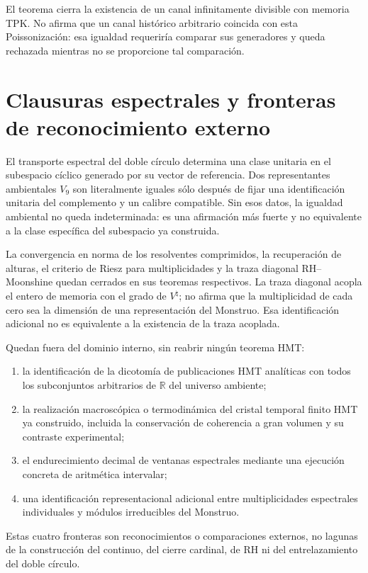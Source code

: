 El teorema cierra la existencia de un canal infinitamente divisible con
memoria TPK\@. No afirma que un canal histórico arbitrario coincida con esta
Poissonización: esa igualdad requeriría comparar sus generadores y queda
rechazada mientras no se proporcione tal comparación.

\section{Clausuras espectrales y fronteras de reconocimiento externo}
\label{sec:hmt-final-clausuras-espectrales-externas}

\begin{proposition}
\label{prop:hmt-final-equivalencia-calibrada-vnueve}
El transporte espectral del doble círculo determina una clase unitaria en el
subespacio cíclico generado por su vector de referencia. Dos representantes
ambientales \(V_9\) son literalmente iguales sólo después de fijar una
identificación unitaria del complemento y un calibre compatible. Sin esos
datos, la igualdad ambiental no queda indeterminada: es una afirmación más
fuerte y no equivalente a la clase específica del subespacio ya construida.
\end{proposition}

La convergencia en norma de los resolventes comprimidos, la recuperación de
alturas, el criterio de Riesz para multiplicidades y la traza diagonal
RH--Moonshine quedan cerrados en sus teoremas respectivos. La traza diagonal
acopla el entero de memoria con el grado de \(V^{\natural}\); no afirma que la
multiplicidad de cada cero sea la dimensión de una representación del
Monstruo. Esa identificación adicional no es equivalente a la existencia de
la traza acoplada.

Quedan fuera del dominio interno, sin reabrir ningún teorema HMT:
\begin{enumerate}
 \item la identificación de la dicotomía de publicaciones HMT analíticas con
 todos los subconjuntos arbitrarios de \(\mathbb R\) del universo ambiente;
 \item la realización macroscópica o termodinámica del cristal temporal
 finito HMT ya construido, incluida la conservación de coherencia a gran
 volumen y su contraste experimental;
 \item el endurecimiento decimal de ventanas espectrales mediante una
 ejecución concreta de aritmética intervalar;
 \item una identificación representacional adicional entre multiplicidades
 espectrales individuales y módulos irreducibles del Monstruo.
\end{enumerate}
Estas cuatro fronteras son reconocimientos o comparaciones externos, no
lagunas de la construcción del continuo, del cierre cardinal, de RH ni del
entrelazamiento del doble círculo.

